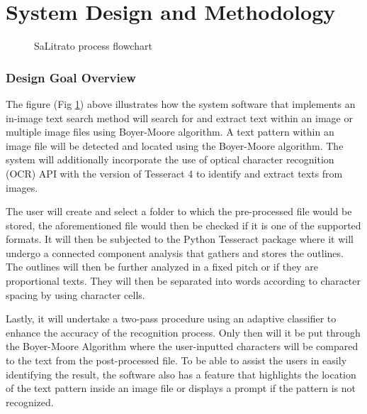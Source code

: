 \part{System Design and Methodology}


\begin{figure}[hbt!]
	\center
	\noindent{}
	\caption{SaLitrato process flowchart}
	\label{fig:salitrato_flowchart}
\end{figure}

\section*{Design Goal Overview}

\hspace\parindent
The figure (Fig \ref{fig:salitrato_flowchart}) above illustrates how the system software that implements an in-image text search method will search for and extract text within an image or multiple image files using Boyer-Moore algorithm. A text pattern within an image file will be detected and located using the Boyer-Moore algorithm. The system will additionally incorporate the use of optical character recognition (OCR) API with the version of Tesseract 4 to identify and extract texts from images.

\hfill

The user will create and select a folder to which the pre-processed file would be stored, the aforementioned file would then be checked if it is one of the supported formats. It will then be subjected to the Python Tesseract package where it will undergo a connected component analysis that gathers and stores the outlines. The outlines will then be further analyzed in a fixed pitch or if they are proportional texts. They will then be separated into words according to character spacing by using character cells.

\hfill

Lastly, it will undertake a two-pass procedure using an adaptive classifier to enhance the accuracy of the recognition process. Only then will it be put through the Boyer-Moore Algorithm where the user-inputted characters will be compared to the text from the post-processed file. To be able to assist the users in easily identifying the result, the software also has a feature that highlights the location of the text pattern inside an image file or displays a prompt if the pattern is not recognized.

